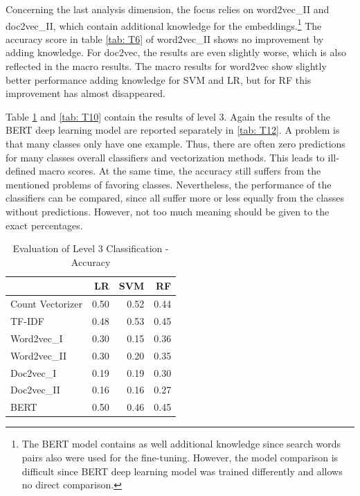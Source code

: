 \documentclass[12pt, a4paper, titlepage]{article}
\begin{document}
Concerning the last analysis dimension, the focus relies on word2vec\_II and doc2vec\_II, which contain additional knowledge for the embeddings.\footnote{The \ac{BERT} model contains as well additional knowledge since search words pairs also were used for the fine-tuning. However, the model comparison is difficult since \ac{BERT} deep learning model was trained differently and allows no direct comparison.} The accuracy score in table \ref{tab: T6}  of word2vec\_II shows no improvement by adding knowledge. For doc2vec, the results are even slightly worse, which is also reflected in the macro results. The macro results for word2vec show slightly better performance adding knowledge for \ac{SVM} and \ac{LR}, but for \ac{RF} this improvement has almost disappeared.

Table \ref{tab: T8} and \ref{tab: T10} contain the results of level 3. Again the results of the \ac{BERT} deep learning model are reported separately in \ref{tab: T12}. A problem is that many classes only have one example. Thus, there are often zero predictions for many classes overall classifiers and vectorization methods. This leads to ill-defined macro scores. At the same time, the accuracy still suffers from the mentioned problems of favoring classes. Nevertheless, the performance of the classifiers can be compared, since all suffer more or less equally from the classes without predictions. However, not too much meaning should be given to the exact percentages.

\begin{table}[hb!]
  \center
\begin{tabular}{lrrr}
\hline
{} &   \textbf{LR} &   \textbf{SVM} &    \textbf{RF} \\
\hline
Count Vectorizer &  0.50 &  0.52 &  0.44 \\
TF-IDF           &  0.48 &  0.53 &  0.45 \\
Word2vec\_I      &  0.30 &  0.15 &  0.36 \\
Word2vec\_II     &  0.30 &  0.20 &  0.35 \\
Doc2vec\_I       &  0.19 &  0.19 &  0.30 \\
Doc2vec\_II      &  0.16 &  0.16 &  0.27 \\
BERT            &  0.50 &  0.46 &  0.45 \\
\hline
\end{tabular}
\caption{\label{tab: T8} Evaluation of Level 3 Classification - Accuracy}
\end{table}
\end{document}
